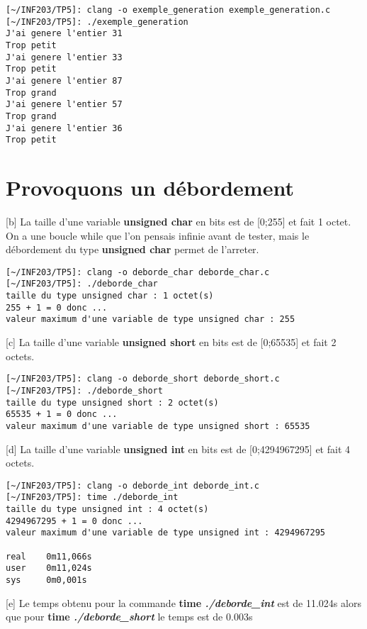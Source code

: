 \documentclass[12pt,a4paper,notitlepage,colorinlistoftodos]{article}
\begin{document}
\begin{lstlisting}
[~/INF203/TP5]: clang -o exemple_generation exemple_generation.c
[~/INF203/TP5]: ./exemple_generation 
J'ai genere l'entier 31
Trop petit
J'ai genere l'entier 33
Trop petit
J'ai genere l'entier 87
Trop grand
J'ai genere l'entier 57
Trop grand
J'ai genere l'entier 36
Trop petit
\end{lstlisting}

\newpage
\section{Provoquons un débordement}

[b]
La taille d'une variable \textbf{unsigned char} en bits est de [0;255] et fait 1 octet.
On a une boucle while que l'on pensais infinie avant de tester, mais le débordement du type \textbf{unsigned char} permet de l'arreter. 

\begin{lstlisting}
[~/INF203/TP5]: clang -o deborde_char deborde_char.c 
[~/INF203/TP5]: ./deborde_char 
taille du type unsigned char : 1 octet(s)
255 + 1 = 0 donc ...
valeur maximum d'une variable de type unsigned char : 255
\end{lstlisting}


[c]
La taille d'une variable \textbf{unsigned short} en bits est de [0;65535] et fait 2 octets.

\begin{lstlisting}
[~/INF203/TP5]: clang -o deborde_short deborde_short.c 
[~/INF203/TP5]: ./deborde_short 
taille du type unsigned short : 2 octet(s)
65535 + 1 = 0 donc ...
valeur maximum d'une variable de type unsigned short : 65535
\end{lstlisting}


[d]
La taille d'une variable \textbf{unsigned int} en bits est de [0;4294967295] et fait 4 octets.

\begin{lstlisting}
[~/INF203/TP5]: clang -o deborde_int deborde_int.c 
[~/INF203/TP5]: time ./deborde_int 
taille du type unsigned int : 4 octet(s)
4294967295 + 1 = 0 donc ...
valeur maximum d'une variable de type unsigned int : 4294967295

real    0m11,066s
user    0m11,024s
sys     0m0,001s
\end{lstlisting}


[e]
Le temps obtenu pour la commande \textbf{time \textit{./deborde\_int}} est de 
11.024s alors que pour \textbf{time \textit{./deborde\_short}} le temps est de 0.003s
\end{document}

